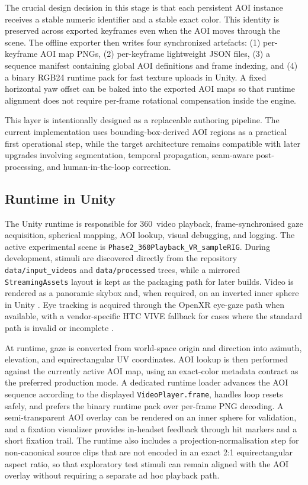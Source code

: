 \documentclass[11pt]{article}
\begin{document}
The crucial design decision in this stage is that each persistent AOI instance receives a stable numeric identifier and a stable exact color. This identity is preserved across exported keyframes even when the AOI moves through the scene. The offline exporter then writes four synchronized artefacts: (1) per-keyframe AOI map PNGs, (2) per-keyframe lightweight JSON files, (3) a sequence manifest containing global AOI definitions and frame indexing, and (4) a binary RGB24 runtime pack for fast texture uploads in Unity. A fixed horizontal yaw offset can be baked into the exported AOI maps so that runtime alignment does not require per-frame rotational compensation inside the engine.

This layer is intentionally designed as a replaceable authoring pipeline. The current implementation uses bounding-box-derived AOI regions as a practical first operational step, while the target architecture remains compatible with later upgrades involving segmentation, temporal propagation, seam-aware post-processing, and human-in-the-loop correction.

\subsection{Runtime in Unity}
The Unity runtime is responsible for 360\textdegree\ video playback, frame-synchronised gaze acquisition, spherical mapping, AOI lookup, visual debugging, and logging. The active experimental scene is \texttt{Phase2\_360Playback\_VR\_sampleRIG}. During development, stimuli are discovered directly from the repository \texttt{data/input\_videos} and \texttt{data/processed} trees, while a mirrored \texttt{StreamingAssets} layout is kept as the packaging path for later builds. Video is rendered as a panoramic skybox and, when required, on an inverted inner sphere in Unity \cite{unity_panoramic_intro,unity_panoramic_video,unity_panoramic_skybox}. Eye tracking is acquired through the OpenXR eye-gaze path when available, with a vendor-specific HTC VIVE fallback for cases where the standard path is invalid or incomplete \cite{openxr_eye_gaze_ext,vive_openxr_overview,vive_eye_gaze,vive_eye_tracker}.

At runtime, gaze is converted from world-space origin and direction into azimuth, elevation, and equirectangular UV coordinates. AOI lookup is then performed against the currently active AOI map, using an exact-color metadata contract as the preferred production mode. A dedicated runtime loader advances the AOI sequence according to the displayed \texttt{VideoPlayer.frame}, handles loop resets safely, and prefers the binary runtime pack over per-frame PNG decoding. A semi-transparent AOI overlay can be rendered on an inner sphere for validation, and a fixation visualizer provides in-headset feedback through hit markers and a short fixation trail. The runtime also includes a projection-normalisation step for non-canonical source clips that are not encoded in an exact 2:1 equirectangular aspect ratio, so that exploratory test stimuli can remain aligned with the AOI overlay without requiring a separate ad hoc playback path.
\end{document}
